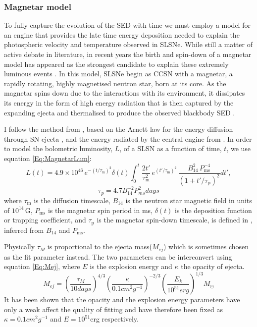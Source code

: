 \subsubsection{Magnetar model}
\label{sec:Magnetar}
To fully capture the evolution of the SED with time we must employ a model for an engine that provides the late time energy deposition needed to explain the photospheric velocity and temperature observed in SLSNe. While still a matter of active debate in literature, in recent years the birth and spin-down of a magnetar model has appeared as the strongest candidate to explain these extremely luminous events \citep{Inserra2013,Nicholl2013}. In this model, SLSNe begin as CCSN with a magnetar, a rapidly rotating, highly magnetised neutron star, born at its core. As the magnetar spins down due to the interactions with its environment, it dissipates its energy in the form of high energy radiation that is then captured by the expanding ejecta and thermalised to produce the observed blackbody SED \citep{Kasen2009,Woosley2010,Inserra2013}.

I follow the method from \citet{Inserra2013}, based on the Arnett law for the energy diffusion through SN ejecta \citep{Arnett1982}, and the energy radiated by the central engine from \citet{Bildsten2013,Wosley2012}. In order to model the bolometric luminosity, $L$, of a SLSN as a function of time, $t$, we use equation \ref{Eq:MagnetarLum}:
\begin{equation}
L(t) = 4.9\times 10^{46}\,e^{ -(t / \tau_\mathrm{m})^2 }\delta(t) \int_{0}^{t} \frac{2t'}{\tau_\mathrm{m}^2}\,e^{(t'/\tau_\mathrm{m})^2}\,\frac{B_{14}^{2}\,P_{\mathrm{ms}}^{-4}}{\left(1+t'/\tau_\mathrm{p}\right)^2} dt',
\label{Eq:MagnetarLum}
\end{equation}
\begin{equation}
\label{Eq:SDPeriod}
\tau_{p} = 4.7B_{14}^{-2}P_{ms}^{2}days
\end{equation}
\noindent where $\tau_\mathrm{m}$ is the diffusion timescale, $B_{14}$ is the neutron star magnetic field in units of $10^{14}$\,G, $P_{\mathrm{ms}}$ is the magnetar spin period in ms, $\delta(t)$ is the deposition function or trapping coefficient, and $\tau_\mathrm{p}$ is the magnetar spin-down timescale, is defined in , inferred from $B_{14}$ and $P_{\mathrm{ms}}$.

Physically $\tau_M$ is proportional to the ejecta mass($M_{ej}$) which is sometimes chosen as the fit parameter instead. The two parameters can be interconvert using equation \ref{Eq:Mej}, where $E$ is the explosion energy and $\kappa$ the opacity of ejecta.
\begin{equation}
\label{Eq:Mej}
M_{ej} = (\frac{\tau_{M}}{10days})^{4/3}(\frac{\kappa}{0.1cm^2g^{-1}})^{-2/3}(\frac{E_k}{10^{51}erg})^{1/3}M_{\odot}
\end{equation}
\noindent It has been shown \citep{Inserra2013,Inserra2014,Nicoll2015,Papadopuplus2014} that the opacity and the explosion energy parameters have only a weak affect the quality of fitting and have therefore been fixed as $\kappa = 0.1cm^2g^{-1}$ and $E = 10^{51}$erg respectively.

